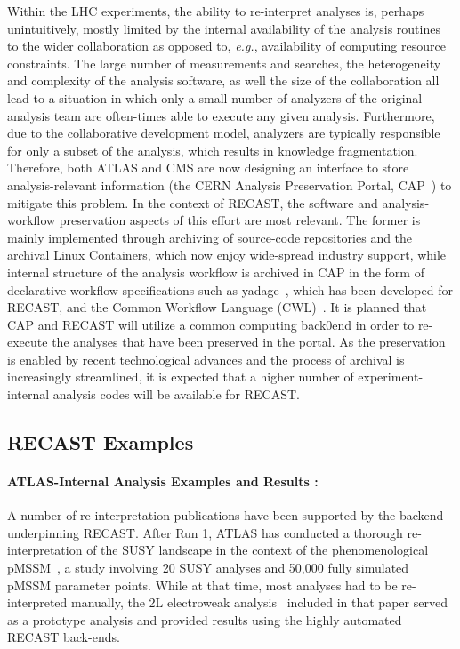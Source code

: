 Within the LHC experiments, the ability to re-interpret analyses is, perhaps unintuitively, mostly limited by the internal availability of the analysis routines to the wider collaboration as opposed to, \emph{e.g.}, availability of computing resource constraints. The large number of measurements and searches, the heterogeneity and complexity of the analysis software, as well the size of the collaboration all lead to a situation in which  only a small number of analyzers of the original analysis team are often-times able to execute any given analysis. Furthermore, due to the collaborative development model, analyzers  are typically responsible for only a subset of the analysis, which results in knowledge fragmentation. Therefore, both ATLAS and CMS are now designing an interface to store analysis-relevant information (the CERN Analysis Preservation Portal, CAP~\cite{CAP}) to mitigate this problem. In the context of RECAST, the software and analysis-workflow preservation aspects of this effort are most relevant. The former is mainly implemented through archiving of source-code repositories and the archival Linux Containers, which now enjoy wide-spread industry support, while internal structure of the analysis workflow is archived in CAP in the form of declarative workflow specifications such as yadage~\cite{Cranmer:2017frf}, which has been developed for RECAST, and the Common Workflow Language (CWL)~\cite{CWL}. It is planned that CAP and RECAST will utilize a common computing back0end in order to re-execute the analyses that have been preserved in the portal. As the preservation is enabled by recent technological advances and the process of archival is increasingly streamlined, it is expected that a higher number of  experiment-internal analysis codes will be available for RECAST.



\subsection{RECAST Examples}

\paragraph{ATLAS-Internal Analysis Examples and Results :}

A number of re-interpretation publications have been supported by the backend underpinning RECAST. After Run 1, ATLAS has conducted a thorough re-interpretation of the SUSY landscape in the context of the phenomenological pMSSM~\cite{Aad:2015baa}, a study involving 20 SUSY analyses and 50,000 fully simulated pMSSM parameter points. While at that time, most analyses had to be re-interpreted manually, the 2L electroweak analysis~\cite{Aad:2014vma} included in that paper served as a prototype analysis and provided results using the highly automated RECAST back-ends.

